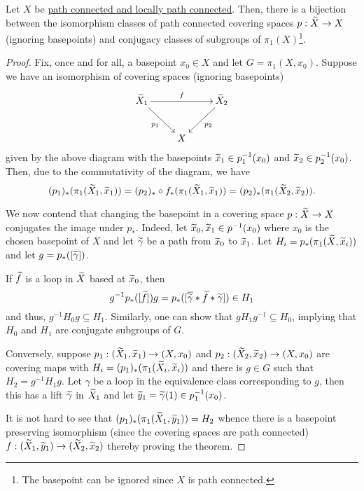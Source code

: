 \begin{theorem}
    Let $X$ be \ul{path connected and locally path connected}. Then, there is a bijection between the isomorphism classes of path connected covering spaces $p:\widetilde{X}\to X$  (ignoring basepoints) and conjugacy classes of subgroups of $\pi_1(X)$\footnote{The basepoint can be ignored since $X$ is path connected.}.
\end{theorem}
\begin{proof}
    Fix, once and for all, a basepoint $x_0\in X$ and let $G = \pi_1(X,x_0)$. Suppose we have an isomorphism of covering spaces (ignoring basepoints)
    \begin{equation*}
        \xymatrix {
            {\wt X_1}\ar[rr]^f\ar[rd]_{p_1} && {\wt X_2}\ar[ld]^{p_2}\\
            & X & 
        }
    \end{equation*}
    given by the above diagram with the basepoints $\widetilde{x}_1\in p_1^{-1}(x_0)$ and $\widetilde{x}_2\in p_2^{-1}(x_0)$. Then, due to the commutativity of the diagram, we have 
    \begin{equation*}
        (p_1)_\ast(\pi_1(\widetilde{X}_1,\widetilde{x}_1)) = (p_2)_\ast\circ f_\ast(\pi_1(\widetilde{X}_1, \widetilde{x}_1)) = (p_2)_\ast(\pi_1(\widetilde{X}_2, \widetilde{x}_2)).
    \end{equation*}

    We now contend that changing the basepoint in a covering space $p:\widetilde{X}\to X$ conjugates the image under $p_\ast$. Indeed, let $\widetilde{x}_0,\widetilde{x}_1\in p^{-1}(x_0)$ where $x_0$ is the chosen basepoint of $X$ and let $\widetilde{\gamma}$ be a path from $\widetilde{x}_0$ to $\widetilde{x}_1$. Let $H_i = p_\ast(\pi_1(\widetilde{X},\widetilde{x}_i))$ and let $g = p_\ast([\widetilde{\gamma}])$.

    If $\widetilde{f}$ is a loop in $\widetilde{X}$ based at $\widetilde{x}_0$, then 
    \begin{equation*}
        g^{-1}p_\ast([\widetilde{f}])g = p_\ast([\overline{\widetilde{\gamma}} * \widetilde{f} * \widetilde{\gamma}])\in H_1
    \end{equation*}
    and thus, $g^{-1}H_0g\subseteq H_1$. Similarly, one can show that $gH_1g^{-1}\subseteq H_0$, implying that $H_0$ and $H_1$ are conjugate subgroups of $G$.

    Conversely, suppose $p_1: (\widetilde{X}_1,\widetilde{x}_1)\to(X,x_0)$ and $p_2: (\widetilde{X}_2,\widetilde{x}_2)\to(X,x_0)$ are covering maps with $H_i = (p_1)_\ast(\pi_1(\widetilde{X}_i,\widetilde{x}_i))$ and there is $g\in G$ such that $H_2 = g^{-1}H_1g$. Let $\gamma$ be a loop in the equivalence class corresponding to $g$, then this has a lift $\widetilde{\gamma}$ in $\widetilde{X}_1$ and let $\widetilde{y}_1 = \widetilde{\gamma}(1)\in p_1^{-1}(x_0)$. 

    It is not hard to see that $(p_1)_\ast(\pi_1(\widetilde{X}_1, \widetilde{y}_1)) = H_2$ whence there is a basepoint preserving isomorphism (since the covering spaces are path connected) $f:(\widetilde{X}_1,\widetilde{y}_1)\to(\widetilde{X}_2,\widetilde{x}_2)$ thereby proving the theorem.
\end{proof}

